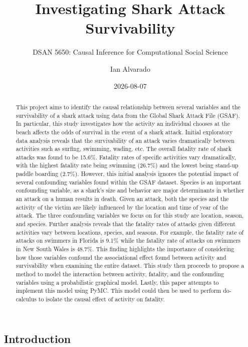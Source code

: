 \documentclass[
  letterpaper,
  DIV=11,
  numbers=noendperiod]{scrartcl}
\title{Investigating Shark Attack Survivability}
\subtitle{DSAN 5650: Causal Inference for Computational Social Science}
\author{Ian Alvarado}
\date{2026-08-07}
\begin{document}
\maketitle
\begin{abstract}
This project aims to identify the causal relationship between several
variables and the survivability of a shark attack using data from the
Global Shark Attack File (GSAF). In particular, this study investigates
how the activity an individual chooses at the beach affects the odds of
survival in the event of a shark attack. Initial exploratory data
analysis reveals that the survivability of an attack varies dramatically
between activities such as surfing, swimming, wading, etc. The overall
fatality rate of shark attacks was found to be 15.6\%. Fatality rates of
specific activities vary dramatically, with the highest fatality rate
being swimming (26.7\%) and the lowest being stand-up paddle boarding
(2.7\%). However, this initial analysis ignores the potential impact of
several confounding variables found within the GSAF dataset. Species is
an important confounding variable, as a shark's size and behavior are
major determinants in whether an attack on a human results in death.
Given an attack, both the species and the activity of the victim are
likely influenced by the location and time of year of the attack. The
three confounding variables we focus on for this study are location,
season, and species. Further analysis reveals that the fatality rates of
attacks given different activities vary between locations, species, and
seasons. For example, the fatality rate of attacks on swimmers in
Florida is 9.1\% while the fatality rate of attacks on swimmers in New
South Wales is 48.7\%. This finding highlights the importance of
considering how those variables confound the associational effect found
between activity and survivability when examining the entire dataset.
This study then proceeds to propose a method to model the interaction
between activity, fatality, and the confounding variables using a
probabilistic graphical model. Lastly, this paper attempts to implement
this model using PyMC. This model could then be used to perform
do-calculus to isolate the causal effect of activity on fatality.
\end{abstract}

\subsection{Introduction}\label{sec-1}
\end{document}
